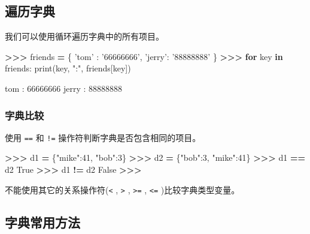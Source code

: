 \documentclass[]{ctexbook}
\newenvironment{Shaded}{\begin{snugshade}}{\end{snugshade}}
\newcommand{\BuiltInTok}[1]{#1}
\newcommand{\ControlFlowTok}[1]{\textcolor[rgb]{0.13,0.29,0.53}{\textbf{#1}}}
\newcommand{\DecValTok}[1]{\textcolor[rgb]{0.00,0.00,0.81}{#1}}
\newcommand{\KeywordTok}[1]{\textcolor[rgb]{0.13,0.29,0.53}{\textbf{#1}}}
\newcommand{\NormalTok}[1]{#1}
\newcommand{\OperatorTok}[1]{\textcolor[rgb]{0.81,0.36,0.00}{\textbf{#1}}}
\newcommand{\StringTok}[1]{\textcolor[rgb]{0.31,0.60,0.02}{#1}}
\newcommand{\VariableTok}[1]{\textcolor[rgb]{0.00,0.00,0.00}{#1}}
\begin{document}
\hypertarget{ux904dux5386ux5b57ux5178}{%
\subsection{遍历字典}\label{ux904dux5386ux5b57ux5178}}

我们可以使用循环遍历字典中的所有项目。

\begin{Shaded}
\begin{Highlighting}[]
\OperatorTok{>>>}\NormalTok{ friends }\OperatorTok{=}\NormalTok{ \{}
     \StringTok{'tom'}\NormalTok{   : }\StringTok{'66666666'}\NormalTok{,}
     \StringTok{'jerry'}\NormalTok{: }\StringTok{'88888888'}
\NormalTok{ \}}
\OperatorTok{>>>} \ControlFlowTok{for}\NormalTok{ key }\KeywordTok{in}\NormalTok{ friends:}
     \BuiltInTok{print}\NormalTok{(key, }\StringTok{":"}\NormalTok{, friends[key])}

\NormalTok{tom : }\DecValTok{66666666}
\NormalTok{jerry : }\DecValTok{88888888}
\end{Highlighting}
\end{Shaded}

\hypertarget{ux5b57ux5178ux6bd4ux8f83}{%
\subsubsection{字典比较}\label{ux5b57ux5178ux6bd4ux8f83}}

使用 \texttt{==} 和 \texttt{!=} 操作符判断字典是否包含相同的项目。

\begin{Shaded}
\begin{Highlighting}[]
\OperatorTok{>>>}\NormalTok{ d1 }\OperatorTok{=}\NormalTok{ \{}\StringTok{"mike"}\NormalTok{:}\DecValTok{41}\NormalTok{, }\StringTok{"bob"}\NormalTok{:}\DecValTok{3}\NormalTok{\}}
\OperatorTok{>>>}\NormalTok{ d2 }\OperatorTok{=}\NormalTok{ \{}\StringTok{"bob"}\NormalTok{:}\DecValTok{3}\NormalTok{, }\StringTok{"mike"}\NormalTok{:}\DecValTok{41}\NormalTok{\}}
\OperatorTok{>>>}\NormalTok{ d1 }\OperatorTok{==}\NormalTok{ d2}
\VariableTok{True}
\OperatorTok{>>>}\NormalTok{ d1 }\OperatorTok{!=}\NormalTok{ d2}
\VariableTok{False}
\OperatorTok{>>>}
\end{Highlighting}
\end{Shaded}

不能使用其它的关系操作符(\texttt{\textless{}} , \texttt{\textgreater{}} , \texttt{\textgreater{}=} , \texttt{\textless{}=} )比较字典类型变量。

\hypertarget{ux5b57ux5178ux5e38ux7528ux65b9ux6cd5}{%
\subsection{字典常用方法}\label{ux5b57ux5178ux5e38ux7528ux65b9ux6cd5}}
\end{document}
